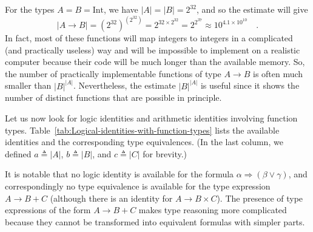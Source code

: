 For the types $A=B=\text{Int}$, we have $\left|A\right|=\left|B\right|=2^{32}$,
and so the estimate will give 
\[
\left|A\rightarrow B\right|=\left(2^{32}\right)^{\left(2^{32}\right)}=2^{32\times2^{32}}=2^{2^{37}}\approx10^{4.1\times10^{10}}\quad.
\]
In fact, most of these functions will map integers to integers in
a complicated (and practically useless) way and will be impossible
to implement on a realistic computer because their code will be much
longer than the available memory. So, the number of practically implementable
functions of type $A\rightarrow B$ is often much smaller than $\left|B\right|^{\left|A\right|}$.
Nevertheless, the estimate $\left|B\right|^{\left|A\right|}$ is useful
since it shows the number of distinct functions that are possible
in principle.

Let us now look for logic identities and arithmetic identities involving
function types. Table~\ref{tab:Logical-identities-with-function-types}
lists the available identities and the corresponding type equivalences.
(In the last column, we defined $a\triangleq\left|A\right|$, $b\triangleq\left|B\right|$,
and $c\triangleq\left|C\right|$ for brevity.) 

It is notable that no logic identity is available for the formula
$\alpha\Rightarrow\left(\beta\vee\gamma\right)$, and correspondingly
no type equivalence is available for the type expression $A\rightarrow B+C$
(although there is an identity for $A\rightarrow B\times C$). The
presence of type expressions of the form $A\rightarrow B+C$ makes
type reasoning more complicated because they cannot be transformed
into equivalent formulas with simpler parts.

